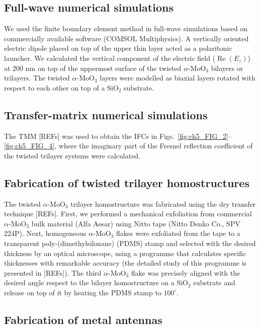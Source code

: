 \subsection{Full-wave numerical simulations}

We used the finite boundary element method in full-wave simulations based on commercially available software (COMSOL Multiphysics). A vertically oriented electric dipole placed on top of the upper thin layer acted as a polaritonic launcher. We calculated the vertical component of the electric field ($\operatorname{Re}(E_z)$) at 200 nm on top of the uppermost surface of the twisted $\alpha\text{-}\mathrm{MoO}_3$ bilayers or trilayers. The twisted $\alpha\text{-}\mathrm{MoO}_3$ layers were modelled as biaxial layers rotated with respect to each other on top of a $\mathrm{SiO}_2$ substrate.

\subsection{Transfer-matrix numerical simulations}

The TMM [REFs] was used to obtain the IFCs in Figs.~\ref{fig:ch5_FIG_2}--\ref{fig:ch5_FIG_4}, where the imaginary part of the Fresnel reflection coefficient of the twisted trilayer systems were calculated.

\subsection{Fabrication of twisted trilayer homostructures}

The twisted $\alpha\text{-}\mathrm{MoO}_3$ trilayer homostructure was fabricated using the dry transfer technique [REFs]. First, we performed a mechanical exfoliation from commercial $\alpha\text{-}\mathrm{MoO}_3$ bulk material (Alfa Aesar) using Nitto tape (Nitto Denko Co., SPV 224P). Next, homogeneous $\alpha\text{-}\mathrm{MoO}_3$ flakes were exfoliated from the tape to a transparent poly-(dimethylsiloxane) (PDMS) stamp and selected with the desired thickness by an optical microscope, using a programme that calculates specific thicknesses with remarkable accuracy (the detailed study of this programme is presented in [REFs]). The third $\alpha\text{-}\mathrm{MoO}_3$ flake was precisely aligned with the desired angle respect to the bilayer homostructure on a $\mathrm{SiO}_2$ substrate and release on top of it by heating the PDMS stamp to $100^\circ$.

\subsection{Fabrication of metal antennas}

